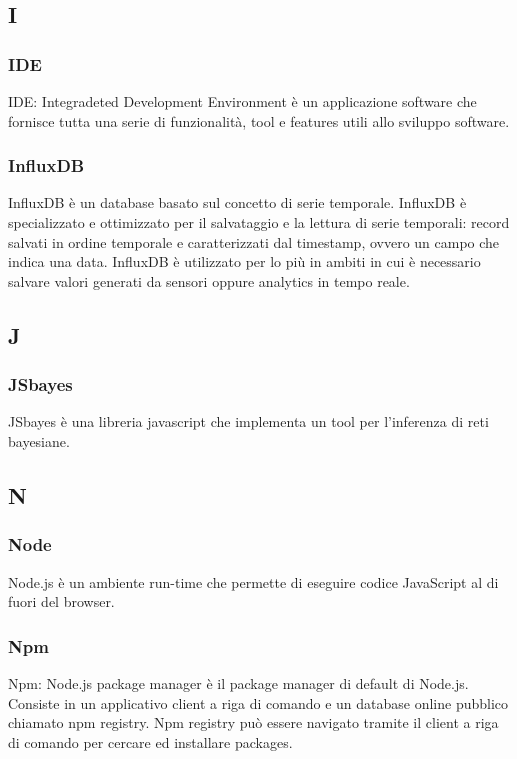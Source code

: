 \subsection*{I}

	\subsubsection*{IDE} 
	\label{sec:ide}
IDE: Integradeted Development Environment è un applicazione software che fornisce tutta una serie di funzionalità, tool e features utili allo sviluppo software.

	\subsubsection*{InfluxDB} 
	\label{sec:influxdb}
InfluxDB è un database basato sul concetto di serie temporale. InfluxDB è specializzato e ottimizzato per il salvataggio e la lettura di serie temporali: record salvati in ordine temporale e caratterizzati dal timestamp, ovvero un campo che indica una data. InfluxDB è utilizzato per lo più in ambiti in cui è necessario salvare valori generati da sensori oppure analytics in tempo reale.
	
\subsection*{J}

	\subsubsection*{JSbayes} 
	\label{sec:influxdb}
JSbayes è una libreria javascript che implementa un tool per l'inferenza di reti bayesiane. 


\subsection*{N}

	\subsubsection*{Node} 
	\label{sec:node}
Node.js è un ambiente run-time che permette di eseguire codice JavaScript al di fuori del browser.

	\subsubsection*{Npm} 
	\label{sec:npm}
Npm: Node.js package manager è il package manager di default di Node.js. Consiste in un applicativo client a riga di comando e un database online pubblico chiamato npm registry. Npm registry può essere navigato tramite il client a riga di comando per cercare ed installare packages.



